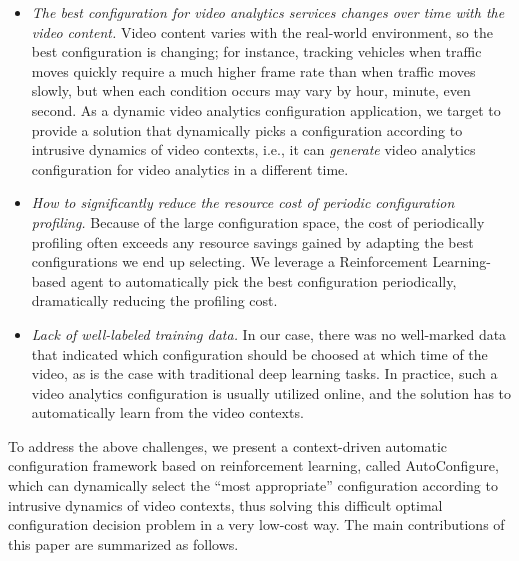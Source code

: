 
\begin{itemize}	
	\item \emph{The best configuration for video analytics services changes over time with the video content.} %
Video content varies with the real-world environment, so the best configuration is changing;
 for instance, tracking vehicles when traffic moves quickly require a much higher frame rate than when traffic moves slowly, but when each condition occurs may vary by hour, minute, even second. As a dynamic video analytics configuration %
application, we target to provide a solution that dynamically picks a configuration according to intrusive dynamics of video contexts, i.e., it can \emph{generate} video analytics configuration for video analytics in a different time.
	
	\item \emph{How to significantly reduce the resource cost of periodic configuration profiling.} Because of the large configuration space, the cost of periodically profiling often exceeds any resource savings gained by adapting the best configurations we end up selecting. We leverage a Reinforcement Learning-based agent to automatically pick the best configuration periodically, dramatically reducing the profiling cost. 
	
	\item \emph{Lack of well-labeled training data.} In our case, there was no well-marked data that indicated which configuration should be choosed at which time of the video, as is the case with traditional deep learning tasks.%
In practice, such a video analytics configuration is usually utilized online, and the solution has to automatically learn from the video contexts. 
\end{itemize}

To address the above challenges, we present a context-driven automatic configuration framework based on reinforcement learning, called AutoConfigure, which can dynamically select the ``most appropriate'' configuration according to intrusive dynamics of video contexts, thus solving this difficult optimal configuration decision problem in a very low-cost way. The main contributions of this paper are summarized as follows.


